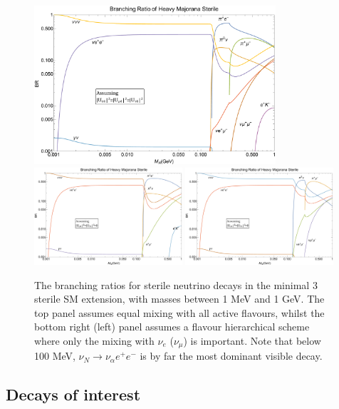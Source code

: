 \documentclass[11pt, a4paper]{article}
\begin{document}
\begin{figure}[t]
%
	\centering
\includegraphics[width=0.8\textwidth]{figures/bounds1.pdf}\\
\includegraphics[width=0.49\textwidth]{figures/bounds2.pdf}
\includegraphics[width=0.49\textwidth]{figures/bounds4.pdf}
%
\caption{\label{fig:branchingratios}The branching ratios for sterile neutrino
decays in the minimal 3 sterile SM extension, with masses between 1 MeV and 1 GeV. The top panel assumes equal
mixing with all active flavours, whilst the bottom right (left) panel assumes a flavour
hierarchical scheme where only the mixing with $\nu_e$ ($\nu_\mu$) is important. Note that below 100 MeV, $\nu_N \rightarrow \nu_\alpha e^+ e^-$ is by far the most dominant visible decay.}
%
\end{figure}

\subsection{Decays of interest}
\end{document}
